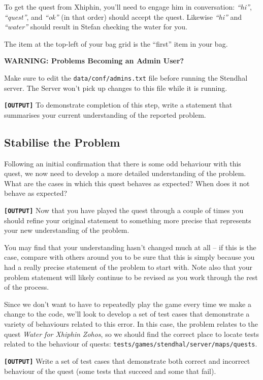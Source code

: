 \documentclass[
]{book}
\begin{document}
To get the quest from Xhiphin, you'll need to engage him in conversation: \emph{``hi''}, \emph{``quest''}, and \emph{``ok''} (in that order) should accept the quest. Likewise \emph{``hi''} and \emph{``water''} should result in Stefan checking the water for you.

The item at the top-left of your bag grid is the ``first'' item in your bag.

\textbf{WARNING: Problems Becoming an Admin User?}

Make sure to edit the \texttt{data/conf/admins.txt} file before running the Stendhal server. The Server won't pick up changes to this file while it is running.

\textbf{\texttt{{[}OUTPUT{]}}} To demonstrate completion of this step, write a statement that summarises your current understanding of the reported problem.

\hypertarget{stabilise}{%
\subsection{Stabilise the Problem}\label{stabilise}}

Following an initial confirmation that there is some odd behaviour with this quest, we now need to develop a more detailed understanding of the problem. What are the cases in which this quest behaves as expected? When does it not behave as expected?

\textbf{\texttt{{[}OUTPUT{]}}} Now that you have played the quest through a couple of times you should refine your original statement to something more precise that represents your new understanding of the problem.

You may find that your understanding hasn't changed much at all -- if this is the case, compare with others around you to be sure that this is simply because you had a really precise statement of the problem to start with. Note also that your problem statement will likely continue to be revised as you work through the rest of the process.

Since we don't want to have to repeatedly play the game every time we make a change to the code, we'll look to develop a set of test cases that demonstrate a variety of behaviours related to this error. In this case, the problem relates to the quest \emph{Water for Xhiphin Zohos}, so we should find the correct place to locate tests related to the behaviour of quests: \texttt{tests/games/stendhal/server/maps/quests}.

\textbf{\texttt{{[}OUTPUT{]}}} Write a set of test cases that demonstrate both correct and incorrect behaviour of the quest (some tests that succeed and some that fail).
\end{document}
